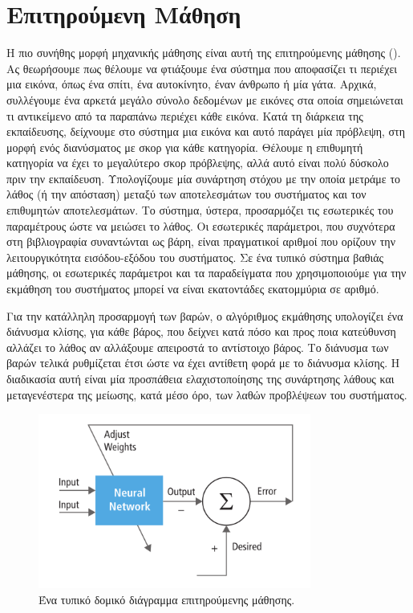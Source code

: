 \section{Επιτηρούμενη Μάθηση}

Η πιο συνήθης μορφή μηχανικής μάθησης είναι αυτή της επιτηρούμενης μάθησης ().
Ας θεωρήσουμε πως θέλουμε να φτιάξουμε ένα σύστημα που αποφασίζει τι περιέχει μια εικόνα, όπως ένα σπίτι, ένα αυτοκίνητο, έναν άνθρωπο ή μία γάτα.
Αρχικά, συλλέγουμε ένα αρκετά μεγάλο σύνολο δεδομένων με εικόνες στα οποία σημειώνεται τι αντικείμενο από τα παραπάνω περιέχει κάθε εικόνα.
Κατά τη διάρκεια της εκπαίδευσης, δείχνουμε στο σύστημα μια εικόνα και αυτό παράγει μία πρόβλεψη, στη μορφή ενός διανύσματος με σκορ για κάθε κατηγορία.
Θέλουμε η επιθυμητή κατηγορία να έχει το μεγαλύτερο σκορ πρόβλεψης, αλλά αυτό είναι πολύ δύσκολο πριν την εκπαίδευση.
Υπολογίζουμε μία συνάρτηση στόχου με την οποία μετράμε το λάθος (ή την απόσταση) μεταξύ των αποτελεσμάτων του συστήματος και τον επιθυμητών αποτελεσμάτων.
Το σύστημα, ύστερα, προσαρμόζει τις εσωτερικές του παραμέτρους ώστε να μειώσει το λάθος.
Οι εσωτερικές παράμετροι, που συχνότερα στη βιβλιογραφία συναντώνται ως βάρη, είναι πραγματικοί αριθμοί που ορίζουν την λειτουργικότητα εισόδου-εξόδου του συστήματος.
Σε ένα τυπικό σύστημα βαθιάς μάθησης, οι εσωτερικές παράμετροι και τα παραδείγματα που χρησιμοποιούμε για την εκμάθηση του συστήματος μπορεί να είναι εκατοντάδες εκατομμύρια σε αριθμό. 

Για την κατάλληλη προσαρμογή των βαρών, ο αλγόριθμος εκμάθησης υπολογίζει ένα διάνυσμα κλίσης, για κάθε βάρος, που δείχνει κατά πόσο και προς ποια κατεύθυνση αλλάζει το λάθος αν αλλάξουμε απειροστά το αντίστοιχο βάρος.
Το διάνυσμα των βαρών τελικά ρυθμίζεται έτσι ώστε να έχει αντίθετη φορά με το διάνυσμα κλίσης.
Η διαδικασία αυτή είναι μία προσπάθεια ελαχιστοποίησης της συνάρτησης λάθους και μεταγενέστερα της μείωσης, κατά μέσο όρο, των λαθών προβλέψεων του συστήματος.

\begin{figure}[tph]
	\includegraphics[width=0.8\textwidth, keepaspectratio]{images/training.png}
	\centering 
	\caption{Ένα τυπικό δομικό διάγραμμα επιτηρούμενης μάθησης.}
	\label{fig:training}
\end{figure}

